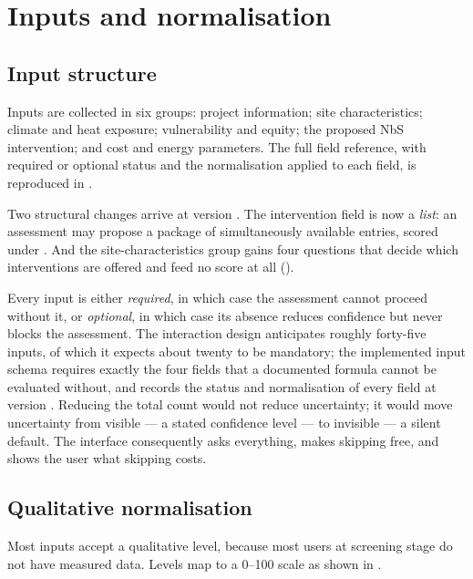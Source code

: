 \section{Inputs and normalisation}
\label{sec:inputs}

\subsection{Input structure}

Inputs are collected in six groups: project information; site characteristics;
climate and heat exposure; vulnerability and equity; the proposed NbS
intervention; and cost and energy parameters. The full field reference, with
required or optional status and the normalisation applied to each field, is
reproduced in .

Two structural changes arrive at version \methver{}. The intervention field
 is now a \emph{list}: an assessment may propose a package
of simultaneously available entries, scored under . And the
site-characteristics group gains four questions that decide which interventions
are offered and feed no score at all ().

Every input is either \emph{required}, in which case the assessment cannot
proceed without it, or \emph{optional}, in which case its absence reduces
confidence but never blocks the assessment. The interaction design anticipates
roughly forty-five inputs, of which it expects about twenty to be mandatory;
the implemented input schema requires exactly the four fields that a
documented formula cannot be evaluated without, and  records
the status and normalisation of every field at version \methver{}. Reducing the total count
would not reduce uncertainty; it would move uncertainty from visible --- a
stated confidence level --- to invisible --- a silent default. The interface
consequently asks everything, makes skipping free, and shows the user what
skipping costs.

\subsection{Qualitative normalisation}
\label{sec:qualitative}

Most inputs accept a qualitative level, because most users at screening stage
do not have measured data. Levels map to a \numrange{0}{100} scale as shown in
.

